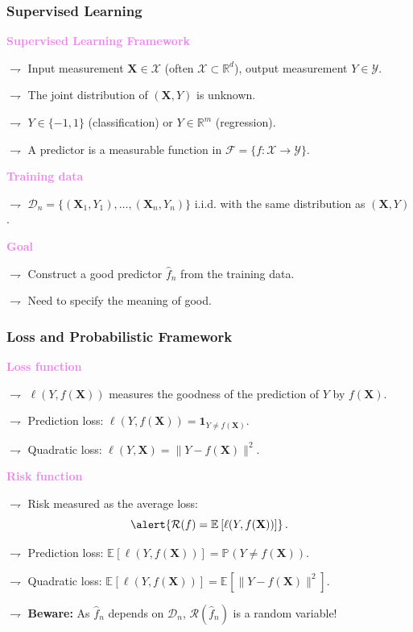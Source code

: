 \documentclass[9pt]{beamer}
\newcommand{\R}{\mathbb{R}}
\newcommand{\Proba}{\mathbb{P}}
\newcommand{\Espe}{\mathbb{E}}
\newcommand{\Prob}[2][]{\Proba_{#1}\left(#2\right)}
\newcommand{\Esp}[2][]{\Espe_{#1}\left[#2\right]}
\begin{document}
\begin{frame} \frametitle{Supervised  Learning}
\textcolor{violet}{{\bf Supervised Learning Framework}}

$\rightharpoondown$ \alert{Input} measurement $\textbf{X}  \in \mathcal{X}$ (often $\mathcal{X} \subset \R^d$), \alert{output} measurement $Y \in \mathcal{Y}$.

$\rightharpoondown$  The joint distribution of $(\textbf{X},Y)$ is  \alert{unknown}.

$\rightharpoondown$  $Y \in \{-1,1\}$ (classification) or $Y \in \mathbb{R}^m$ (regression).


$\rightharpoondown$ A \alert{predictor} is a measurable function in $\mathcal{F} = \{ f:\mathcal{X} \to \mathcal{Y}\}$.

\vspace{.5cm}

\textcolor{violet}{{\bf Training data}}

$\rightharpoondown$ $\mathcal{D}_n=\{(\textbf{X}_1, Y_1),\ldots,(\textbf{X}_n, Y_n)\}$ i.i.d. with the same distribution as $(\textbf{X},Y)$.




\vspace{.5cm}

\textcolor{violet}{{\bf Goal}}

$\rightharpoondown$  Construct a \alert{good} predictor $\widehat{f}_n$ from the training data.

$\rightharpoondown$  Need to specify the meaning of good.

\end{frame}

\begin{frame}
\frametitle{Loss and Probabilistic Framework}
\textcolor{violet}{{\bf Loss function}}

$\rightharpoondown$ $\ell(Y,f(\textbf{X}))$ measures the goodness of the prediction of $Y$ by $f(\textbf{X})$.

$\rightharpoondown$ \alert{Prediction} loss: $\ell(Y,f(\textbf{X}))=\mathbf{1}_{Y\neq f(\textbf{X})}$.

$\rightharpoondown$  \alert{Quadratic} loss: $\ell(Y,\textbf{X})=\|Y-f(\textbf{X})\|^2$.

\vspace{.5cm}

\textcolor{violet}{{\bf Risk function}}

$\rightharpoondown$ Risk measured as the average loss:
	\[
	\alert{\mathcal{R}(f)=\Esp{\ell(Y,f(\textbf{X}))}}\,.
	\]

$\rightharpoondown$ \alert{Prediction} loss: $\Esp{\ell(Y,f(\textbf{X}))}=\Prob{Y\neq f(\textbf{X})}$.

$\rightharpoondown$ \alert{Quadratic} loss: $\Esp {\ell(Y,f(\textbf{X}))}=\Esp{\|Y-f(\textbf{X})\|^2}$.

\vspace{.3cm}

$\rightharpoondown$ \textcolor{lightr}{\textbf{Beware:}}  As $\widehat{f}_n$ depends on $\mathcal{D}_n$, $\mathcal{R}(\widehat{f}_n)$ is a random variable!

\end{frame}
\end{document}
